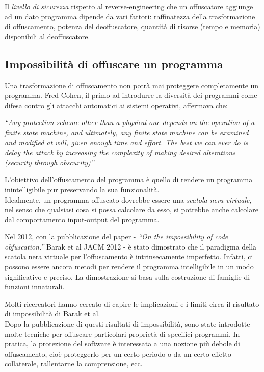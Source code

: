 \documentclass[a4paper,oneside,openright,titlepage,10pt,footinclude,headinclude]{scrbook}
\begin{document}
Il \emph{livello di sicurezza} rispetto al reverse-engineering che un offuscatore aggiunge  ad un dato programma dipende da vari fattori: raffinatezza della trasformazione di offuscamento, potenza del deoffuscatore, quantità di risorse  (tempo e memoria) disponibili al deoffuscatore.\\

\subsection{Impossibilità di offuscare un programma}

Una trasformazione di offuscamento non potrà mai proteggere completamente un programma.
Fred Cohen, il primo ad introdurre la diversità dei programmi come difesa contro gli attacchi automatici ai sistemi operativi, affermava che: \smallskip

\textit{“Any protection scheme other than a physical one depends on the operation of a finite state machine, and ultimately, any finite state machine can be examined and modified at will, given enough time and effort. The best we can ever do is delay the attack by increasing the complexity of making desired alterations (security through obscurity)”}\medskip


L'obiettivo dell'offuscamento del programma è quello di rendere un programma inintelligibile pur preservando la sua funzionalità.\\ Idealmente, un programma offuscato dovrebbe essere una \emph{scatola nera virtuale}, nel senso che qualsiasi cosa si possa calcolare da esso, si potrebbe anche calcolare dal comportamento input-output del programma.\smallskip


Nel 2012, con la pubblicazione del paper - \emph{``On the impossibility of code obfuscation.''} Barak et al JACM 2012 - è stato dimostrato che il paradigma della scatola nera virtuale per l'offuscamento è intrinsecamente imperfetto. Infatti, ci possono essere ancora metodi per rendere il programma intelligibile in un modo significativo e preciso.
La dimostrazione si basa sulla costruzione di famiglie di funzioni innaturali.\smallskip

Molti ricercatori hanno cercato di capire le implicazioni e i limiti circa il risultato di impossibilità di Barak et al.\\
Dopo la pubblicazione di questi risultati di impossibilità, sono state introdotte molte tecniche per offuscare particolari proprietà di specifici programmi.
In pratica, la protezione del software è interessata a una nozione più debole di offuscamento, cioè proteggerlo per un certo periodo o da un certo effetto collaterale, rallentarne la comprensione, ecc.
\end{document}

